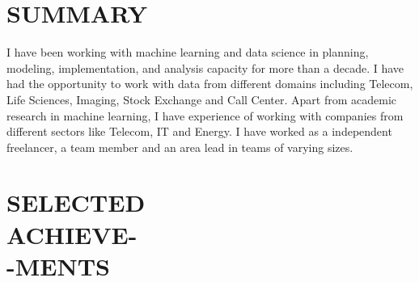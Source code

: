 \documentclass[margin, 10pt]{res} %
\begin{document}
\begin{resume}

 
\section{SUMMARY}
I have been working with machine learning and data science in planning, modeling, implementation, and analysis capacity for more than a decade. 
I have had the opportunity to work with data from different domains including Telecom, Life Sciences, Imaging, Stock Exchange and Call Center.
Apart from academic research in machine learning, I have experience of working with companies from different sectors like Telecom, IT and Energy.
I have worked as a independent freelancer, a team member and an area lead in teams of varying sizes.



\section{SELECTED \\ACHIEVE-\\-MENTS} 


\end{resume}
\end{document}
